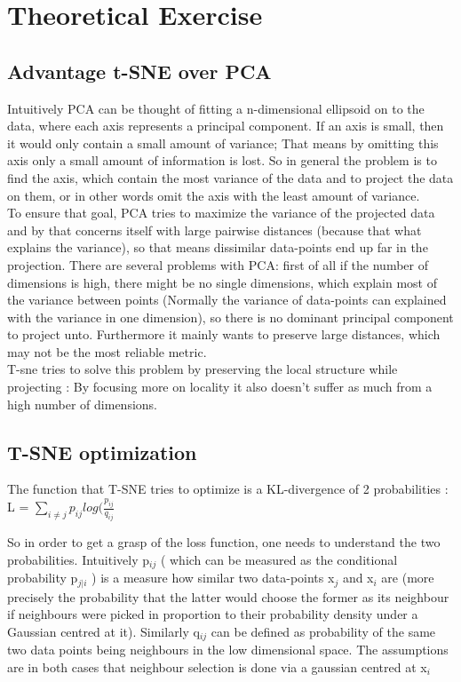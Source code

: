 \documentclass[10pt]{article}
\begin{document}
\section{Theoretical Exercise}
\subsection{Advantage t-SNE over PCA}
Intuitively PCA can be thought of fitting a n-dimensional ellipsoid on to the data, where each axis represents a principal component. If an axis is small, then it would only contain a small amount of variance; That means by omitting this axis only a small amount of information is lost. So in general the problem is to find the axis, which contain the most variance of the data and to project the data on them, or in other words omit the axis with the least amount of variance. \\ To ensure that goal, PCA tries to maximize the variance of the projected data and by that concerns itself with large pairwise distances (because that what explains the variance), so that means dissimilar data-points end up far in the projection.
There are several problems with PCA: first of all if the number of dimensions is high, there might be no single dimensions, which explain most of the variance between points (Normally the variance of data-points can explained with the variance in one dimension), so there is no dominant principal component to project unto. Furthermore it mainly wants to preserve large distances, which may not be the most reliable metric.
\\T-sne tries to solve this problem by preserving the local structure while projecting : By focusing more on locality it also doesn't suffer as much from a high number of dimensions.

\subsection{T-SNE optimization}
The function that T-SNE tries to optimize is a KL-divergence of 2 probabilities :
L = $\sum_{i \neq j} p_ {ij} log(\frac{p_{ij}}{q_{ij}}$

So in order to get a grasp of the loss function, one needs to understand the two probabilities. Intuitively p$_{ij}$  ( which can be measured as the conditional probability p$_{j|i}$ ) is a measure how similar two data-points x$_j$ and x$_i$ are (more precisely the probability that the latter would choose the former as its neighbour  if neighbours were picked in proportion to their probability density under a Gaussian centred at it). Similarly q$_{ij}$ can be defined as probability of the same two data points being neighbours in the low dimensional space. The assumptions are in both cases that neighbour selection is done via a gaussian centred at x$_i$
\end{document}
